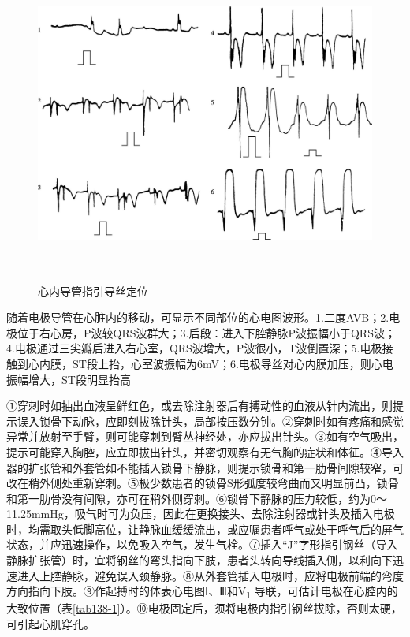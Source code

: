 \begin{figure}[!htbp]
 \centering
 \includegraphics[width=5.95833in,height=4.14583in]{./images/Image00523.jpg}
 \captionsetup{justification=centering}
 \caption{心内导管指引导丝定位}
 \label{fig138-2}
  \end{figure} 

随着电极导管在心脏内的移动，可显示不同部位的心电图波形。1.二度AVB；2.电极位于右心房，P波较QRS波群大；3.后段：进入下腔静脉P波振幅小于QRS波；4.电极通过三尖瓣后进入右心室，QRS波增大，P波很小，T波倒置深；5.电极接触到心内膜，ST段上抬，心室波振幅为6mV；6.电极导丝对心内膜加压，则心电振幅增大，ST段明显抬高

①穿刺时如抽出血液呈鲜红色，或去除注射器后有搏动性的血液从针内流出，则提示误入锁骨下动脉，应即刻拔除针头，局部按压数分钟。②穿刺时如有疼痛和感觉异常并放射至手臂，则可能穿刺到臂丛神经处，亦应拔出针头。③如有空气吸出，提示可能穿入胸腔，应立即拔出针头，并密切观察有无气胸的症状和体征。④导入器的扩张管和外套管如不能插入锁骨下静脉，则提示锁骨和第一肋骨间隙较窄，可改在稍外侧处重新穿刺。⑤极少数患者的锁骨S形弧度较弯曲而又明显前凸，锁骨和第一肋骨没有间隙，亦可在稍外侧穿刺。⑥锁骨下静脉的压力较低，约为0～11.25mmHg，吸气时可为负压，因此在更换接头、去除注射器或针头及插入电极时，均需取头低脚高位，让静脉血缓缓流出，或应嘱患者呼气或处于呼气后的屏气状态，并应迅速操作，以免吸入空气，发生气栓。⑦插入“J”字形指引钢丝（导入静脉扩张管）时，宜将钢丝的弯头指向下肢，患者头转向导线插入侧，以利向下迅速进入上腔静脉，避免误入颈静脉。⑧从外套管插入电极时，应将电极前端的弯度方向指向下肢。⑨作起搏时的体表心电图Ⅰ、Ⅲ和V\textsubscript{1}
导联，可估计电极在心腔内的大致位置（表\ref{tab138-1}）。⑩电极固定后，须将电极内指引钢丝拔除，否则太硬，可引起心肌穿孔。

